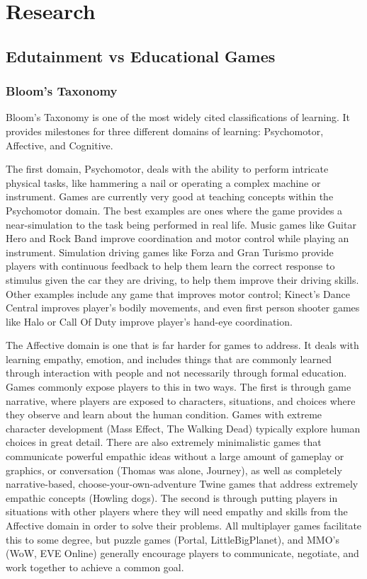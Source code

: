\documentclass[12pt]{report}
\begin{document}
\section{Research}
	\subsection{Edutainment vs Educational Games}
		\subsubsection{Bloom's Taxonomy}

			Bloom's Taxonomy is one of the most widely cited classifications of learning. It provides milestones for three different domains of learning: Psychomotor, Affective, and Cognitive.

			The first domain, Psychomotor, deals with the ability to perform intricate physical tasks, like hammering a nail or operating a complex machine or instrument. Games are currently very good at teaching concepts within the Psychomotor domain. The best examples are ones where the game provides a near-simulation to the task being performed in real life. Music games like Guitar Hero and Rock Band improve coordination and motor control while playing an instrument. Simulation driving games like Forza and Gran Turismo provide players with continuous feedback to help them learn the correct response to stimulus given the car they are driving, to help them improve their driving skills. Other examples include any game that improves motor control; Kinect's Dance Central improves player's bodily movements, and even first person shooter games like Halo or Call Of Duty improve player's hand-eye coordination.

			The Affective domain is one that is far harder for games to address. It deals with learning empathy, emotion, and includes things that are commonly learned through interaction with people and not necessarily through formal education. Games commonly expose players to this in two ways. The first is through game narrative, where players are exposed to characters, situations, and choices where they observe and learn about the human condition. Games with extreme character development (Mass Effect, The Walking Dead) typically explore human choices in great detail. There are also extremely minimalistic games that communicate powerful empathic ideas without a large amount of gameplay or graphics, or conversation (Thomas was alone, Journey), as well as completely narrative-based, choose-your-own-adventure Twine games that address extremely empathic concepts (Howling dogs). The second is through putting players in situations with other players where they will need empathy and skills from the Affective domain in order to solve their problems. All multiplayer games facilitate this to some degree, but puzzle games (Portal, LittleBigPlanet), and MMO's (WoW, EVE Online) generally encourage players to communicate, negotiate, and work together to achieve a common goal.
\end{document}
